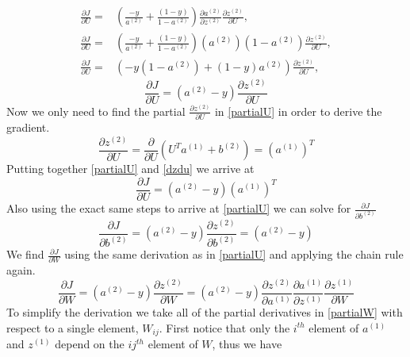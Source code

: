 \documentclass{article}
\begin{document}
\begin{displaymath}
\begin{aligned}
\frac{\partial J}{\partial U} =&  \left(\frac{-y}{a^{(2)}}+\frac{(1-y)}{1-a^{(2)}}\right)\frac{\partial a^{(2)}}{\partial z^{(2)}} \frac{\partial z^{(2)}}{\partial U}, \\
\frac{\partial J}{\partial U} =& \left(\frac{-y}{a^{(2)}}+\frac{(1-y)}{1-a^{(2)}}\right)(a^{(2)})(1-a^{(2)}) \frac{\partial z^{(2)}}{\partial U}, \\
\frac{\partial J}{\partial U} =& \left(-y(1-a^{(2)})+(1-y)a^{(2)}\right)\frac{\partial z^{(2)}}{\partial U},
\end{aligned}
\end{displaymath}
\begin{equation}\label{partialU}
\frac{\partial J}{\partial U} = \left(a^{(2)} - y\right)\frac{\partial z^{(2)}}{\partial U}
\end{equation}
Now we only need to find the partial \( \frac{\partial z^{(2)}}{\partial U} \) in \eqref{partialU} in order to derive the gradient.
\begin{equation}\label{dzdu}
\frac{\partial z^{(2)}}{\partial U} = \frac{\partial }{\partial U}\left(U^Ta^{(1)}+b^{(2)}\right) = (a^{(1)})^T
\end{equation}
Putting together \eqref{partialU} and \eqref{dzdu} we arrive at
\begin{equation}\label{djdu}
\frac{\partial J}{\partial U} = \left(a^{(2)} - y\right)(a^{(1)})^T
\end{equation}
Also using the exact same steps to arrive at \eqref{partialU} we can solve for \( \frac{\partial J}{\partial b^{(2)}}\)
\begin{equation}\label{djdb2}
\frac{\partial J}{\partial b^{(2)}} = \left(a^{(2)} - y\right)\frac{\partial z^{(2)}}{\partial b^{(2)}}  = \left(a^{(2)} - y\right)
\end{equation}
We find \( \frac{\partial J}{\partial W}\) using the same derivation as in \eqref{partialU} and applying the chain rule again.
\begin{equation}\label{partialW}
\frac{\partial J}{\partial W} = \left(a^{(2)} - y\right)\frac{\partial z^{(2)}}{\partial W} = \left(a^{(2)} - y\right)\frac{\partial z^{(2)}}{\partial a^{(1)}}\frac{\partial a^{(1)}}{\partial z^{(1)}}\frac{\partial z^{(1)}}{\partial W}
\end{equation}
To simplify the derivation we take all of the partial derivatives in \eqref{partialW} with respect to a single element, \(W_{ij}\).  First notice that only the \(i^{th}\) element of \(a^{(1)}\) and \(z^{(1)}\) depend on the \(ij^{th}\) element of \(W\), thus we have
\end{document}
